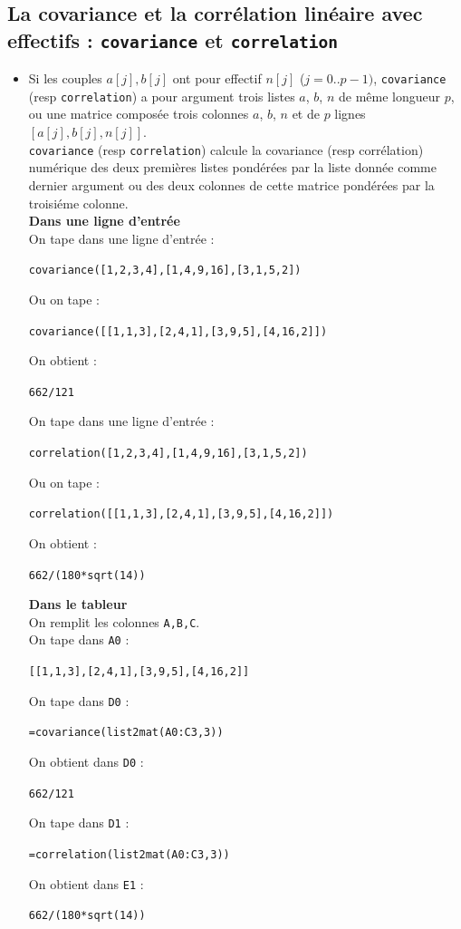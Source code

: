 \documentclass[a4paper,11pt]{book}
\begin{document}
\subsection{La covariance et la corr\'elation lin\'eaire avec effectifs : {\tt covariance} et {\tt correlation}}\label{sec:corre}
\begin{itemize}
\item Si les couples $a[j],b[j]$ ont pour 
effectif $n[j]$ ($j=0..p-1)$, {\tt covariance} (resp {\tt correlation}) a pour 
argument trois listes $a$, $b$, $n$ de m\^eme longueur $p$, ou 
une matrice compos\'ee trois colonnes $a$, $b$, $n$ et de $p$ lignes 
$[a[j],b[j],n[j]]$.\\ 
{\tt covariance} (resp {\tt correlation}) calcule la covariance (resp 
corr\'elation) num\'erique des deux premi\`eres 
listes pond\'er\'ees par la liste donn\'ee comme dernier argument ou 
des deux colonnes de cette matrice pond\'er\'ees par la troisi\'eme colonne.\\
{\bf Dans une ligne d'entr\'ee}\\
On tape dans une ligne d'entr\'ee :
\begin{center}{\tt covariance([1,2,3,4],[1,4,9,16],[3,1,5,2])}\end{center}
Ou on tape :
\begin{center}{\tt covariance([[1,1,3],[2,4,1],[3,9,5],[4,16,2]])}\end{center}
On obtient : 
\begin{center}{\tt 662/121}\end{center}
On tape dans une ligne d'entr\'ee :
\begin{center}{\tt correlation([1,2,3,4],[1,4,9,16],[3,1,5,2])}\end{center}
Ou on tape :
\begin{center}{\tt correlation([[1,1,3],[2,4,1],[3,9,5],[4,16,2]])}\end{center}
On obtient : 
\begin{center}{\tt 662/(180*sqrt(14))}\end{center}
{\bf Dans le tableur}\\
On remplit les colonnes {\tt A,B,C}.\\
On tape dans {\tt A0} :
\begin{center}{\tt [[1,1,3],[2,4,1],[3,9,5],[4,16,2]]}\end{center} 
 On tape dans {\tt D0} :
\begin{center}{\tt =covariance(list2mat(A0:C3,3))}\end{center}
On obtient dans {\tt D0} : 
\begin{center}{\tt 662/121}\end{center}
On tape dans {\tt D1} :
\begin{center}{\tt =correlation(list2mat(A0:C3,3))}\end{center}
On obtient dans {\tt E1} : 
\begin{center}{\tt 662/(180*sqrt(14))}\end{center}


\end{itemize}
\end{document}

